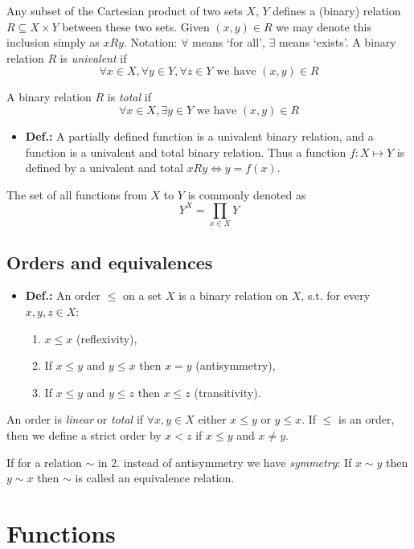 \documentclass{article}
\begin{document}
Any subset of the Cartesian product of two sets $X$, $Y$ defines a (binary) relation $R \subseteq X \times Y $ between these two sets. Given $(x, y) \in R$ we may denote this inclusion simply as $xRy$. 
   Notation: $\forall$ means ‘for all’, $\exists$ means ‘exists’.
A binary relation $R$ is \textit{univalent} if
\[
\forall x \in X, \forall y \in Y, \forall z \in Y \text{ we have } (x, y)\in R
\]

A binary relation $R$ is \textit{total} if
\[
\forall x \in X, \exists y \in Y \text{ we have } (x,y) \in R
\]

\begin{itemize}
\item \textbf{Def.:} A partially defined function is a univalent binary relation, and a function is a univalent and total binary relation. Thus a function $f: X \mapsto Y$ is defined by a univalent and total $xRy\iff y = f(x)$.
\end{itemize}
The set of all functions from $X$ to $Y$ is commonly denoted as 
\[
Y^X = \prod_{x\in X}Y
\]

\subsection{Orders and equivalences}
\begin{itemize}
\item \textbf{Def.:} An order $\leq$ on a set $X$ is a binary relation on $X$, s.t. for every $x, y, z \in X$:
\begin{enumerate}
    \item $x \leq x$ (reflexivity),
    \item If $x \leq y$ and $y \leq x$ then $x=y$ (antisymmetry),
    \item If $x \leq y$ and $y\leq z$ then $x\leq z$ (transitivity).
\end{enumerate}
\end{itemize}

An order is \textit{linear} or \textit{total} if $\forall x,y\in X$ either $x\leq y$ or $y\leq x$. If $\leq$ is an order, then we define a strict order by $x < z$ if $x\leq y$ and $x\neq y$.

If for a relation $\sim$ in 2. instead of antisymmetry we have \textit{symmetry}: 
If $x\sim y$ then $y\sim x$
then $\sim$ is called an equivalence relation.

\section{Functions}
\end{document}
